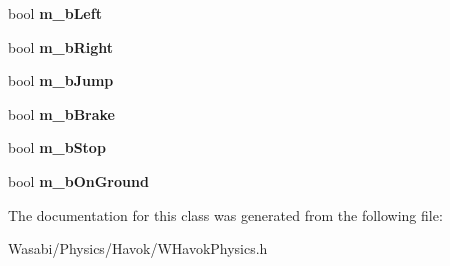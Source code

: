 \begin{DoxyCompactItemize}
\item 
bool {\bfseries m\+\_\+b\+Left}\hypertarget{class_w_marble_action_a521d0a5350b3fe19ed63fd21f052f600}{}\label{class_w_marble_action_a521d0a5350b3fe19ed63fd21f052f600}

\item 
bool {\bfseries m\+\_\+b\+Right}\hypertarget{class_w_marble_action_a8cfb2837a650a2a73b6df1a4bc4d3388}{}\label{class_w_marble_action_a8cfb2837a650a2a73b6df1a4bc4d3388}

\item 
bool {\bfseries m\+\_\+b\+Jump}\hypertarget{class_w_marble_action_a2f18111ceb724aa6b03f342afd910ff1}{}\label{class_w_marble_action_a2f18111ceb724aa6b03f342afd910ff1}

\item 
bool {\bfseries m\+\_\+b\+Brake}\hypertarget{class_w_marble_action_ac6efcccaad1340eca0823952605fd8b9}{}\label{class_w_marble_action_ac6efcccaad1340eca0823952605fd8b9}

\item 
bool {\bfseries m\+\_\+b\+Stop}\hypertarget{class_w_marble_action_a60343644fce80e6460f4f7d3be9306cb}{}\label{class_w_marble_action_a60343644fce80e6460f4f7d3be9306cb}

\item 
bool {\bfseries m\+\_\+b\+On\+Ground}\hypertarget{class_w_marble_action_ae12f429ef9f4210c624eda19c125c8e9}{}\label{class_w_marble_action_ae12f429ef9f4210c624eda19c125c8e9}

\end{DoxyCompactItemize}


The documentation for this class was generated from the following file\+:\begin{DoxyCompactItemize}
\item 
Wasabi/\+Physics/\+Havok/W\+Havok\+Physics.\+h\end{DoxyCompactItemize}
